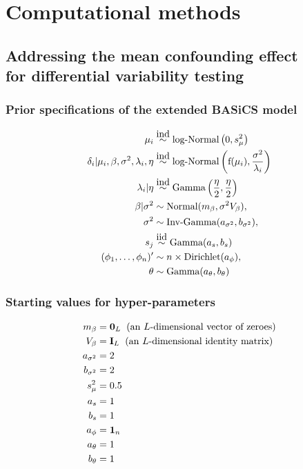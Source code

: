 
\chapter{Computational methods} 

\section{Addressing the mean confounding effect \\ for differential variability testing}
\label{appB.1}

\subsection{Prior specifications of the extended BASiCS model}

\begin{align*}
\mu_i &\stackrel{\mbox{ind}}{\sim} \mbox{log-Normal}\left(0, s^2_{\mu}\right) \\
\delta_i| \mu_i,\beta,\sigma^2, \lambda_i, \eta &\stackrel{\mbox{ind}}{\sim} \text{log-Normal}\left( \text{f}(\mu_i),\frac{\sigma^2}{\lambda_i} \right)\\
\lambda_i|\eta &\stackrel{\mbox{ind}}{\sim} \text{Gamma}\left(\frac{\eta}{2},\frac{\eta}{2}\right)\\
\beta|\sigma^2 & \sim \textnormal{Normal}(m_\beta,\sigma^2V_\beta),\\
\sigma^2 & \sim  \textnormal{Inv-Gamma}(a_{\sigma^2},b_{\sigma^2}),\\
s_j & \stackrel{\mbox{iid}}{\sim}  \textnormal{Gamma}(a_s,b_s) \\
(\phi_1, \ldots, \phi_n)' & \sim  n \times \textnormal{Dirichlet}(a_\phi),\\
\theta & \sim  \textnormal{Gamma}(a_\theta,b_\theta)
\end{align*}

\newpage

\subsection{Starting values for hyper-parameters}
\label{appB.1.hyper}

\begin{align*}
m_{\beta} & = \mathbf{0}_L \hspace{0.2cm} \text{(an $L$-dimensional vector of zeroes)}\\
V_{\beta} & = \mathbf{I}_L \hspace{0.2cm} \text{(an $L$-dimensional identity matrix)}\\
a_{\sigma^2} & = 2\\
b_{\sigma^2} & = 2\\
s^2_{\mu}& =  0.5\\
a_s& = 1\\
b_s& = 1\\
a_\phi& =  \mathbf{1}_n\\
a_\theta& = 1\\
b_\theta& = 1
\end{align*}

